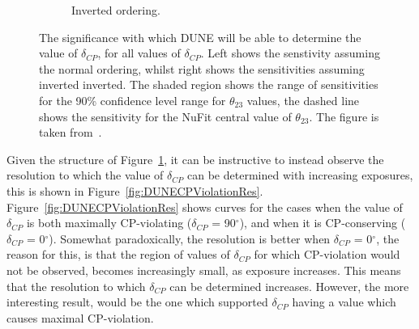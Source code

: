 \begin{figure}
\begin{subfigure}{0.49\textwidth}
    \caption{Inverted ordering.}
  \end{subfigure}
  \caption[The significance with which DUNE will be able to determine the value of $\delta_{CP}$, for all values of $\delta_{CP}$]
          {The significance with which DUNE will be able to determine the value of $\delta_{CP}$, for all values of $\delta_{CP}$. Left shows the senstivity assuming the normal ordering, whilst right shows the sensitivities assuming inverted inverted. The shaded region shows the range of sensitivities for the 90\% confidence level range for $\theta_{23}$ values, the dashed line shows the sensitivity for the NuFit central value of $\theta_{23}$. The figure is taken from~\citep{DUNE2332}.}
  \label{fig:DUNECPViolation}
\end{figure}

Given the structure of Figure~\ref{fig:DUNECPViolation}, it can be instructive to instead observe the resolution to which the value of $\delta_{CP}$ can be determined with increasing exposures, this is shown in Figure~\ref{fig:DUNECPViolationRes}. Figure~\ref{fig:DUNECPViolationRes} shows curves for the cases when the value of $\delta_{CP}$ is both maximally CP-violating ($\delta_{CP}$ = 90$^{\circ}$), and when it is CP-conserving ($\delta_{CP}$ = 0$^{\circ}$). Somewhat paradoxically, the resolution is better when $\delta_{CP}$ = 0$^{\circ}$, the reason for this, is that the region of values of $\delta_{CP}$ for which CP-violation would not be observed, becomes increasingly small, as exposure increases. This means that the resolution to which $\delta_{CP}$ can be determined increases. However, the more interesting result, would be the one which supported $\delta_{CP}$ having a value which causes maximal CP-violation. \\


